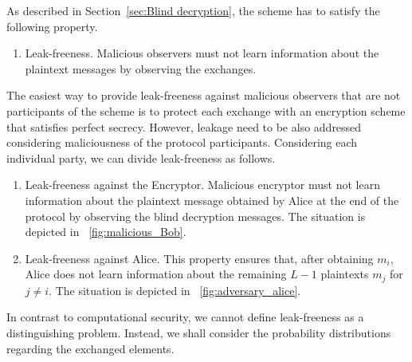 \documentclass[10pt,journal]{IEEEtran}
\begin{document}
As described in Section~\ref{sec:Blind decryption}, the scheme has to satisfy the following property.
\begin{enumerate}
	\item Leak-freeness. Malicious observers
	must not learn information about the plaintext messages by observing the exchanges.
\end{enumerate}
The easiest way to provide leak-freeness against malicious observers
that are not participants of the scheme
is to
protect each exchange
with an encryption scheme that satisfies perfect secrecy.
However, leakage need to
be also addressed considering maliciousness of the protocol participants.
Considering each individual party, we can divide leak-freeness as follows.
\begin{enumerate}[label*=1.\arabic*)]
	\item Leak-freeness against the Encryptor. Malicious encryptor
	must not learn information about the plaintext message obtained by Alice at the end of the protocol
	by observing the blind decryption messages. The situation is depicted in
\figurename~\ref{fig:malicious_Bob}.
	\item Leak-freeness against Alice. This property ensures that, after obtaining $m_i$, Alice does not learn information about
	the remaining $L-1$ plaintexts $m_j$ for $j \neq i$. The situation is depicted in \figurename~\ref{fig:adversary_alice}.
\end{enumerate}
In contrast to computational security, we cannot define
leak-freeness as a distinguishing problem. Instead, we shall consider
the probability distributions regarding the exchanged elements.
\end{document}

